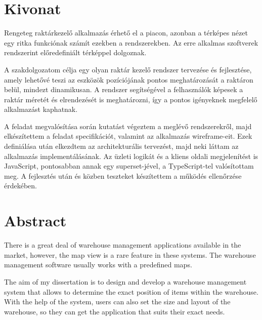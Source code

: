 \setcounter{page}{1}

\selecthungarian

\chapter*{Kivonat}

Rengeteg raktárkezelő alkalmazás érhető el a piacon, azonban a térképes nézet egy ritka funkciónak számít ezekben a rendszerekben. Az erre alkalmas szoftverek rendszerint előredefiniált térképpel dolgoznak.

A szakdolgozatom célja egy olyan raktár kezelő rendszer tervezése és fejlesztése, amely lehetővé teszi az eszközök pozíciójának pontos meghatározását a raktáron belül, mindezt dinamikusan. A rendszer segítségével a felhasználók képesek a raktár méretét és elrendezését is meghatározni, így a pontos igényeknek megfelelő alkalmazást kaphatnak.

A feladat megvalósítása során kutatást végeztem a meglévő rendszerekről, majd elkészítettem a feladat specifikációt, valamint az alkalmazás wireframe-eit. Ezek definiálása után elkezdtem az architekturális tervezést, majd neki láttam az alkalmazás implementálásának. Az üzleti logikát és a kliens oldali megjelenítést is JavaScript, pontosabban annak egy superset-jével, a TypeScript-tel valósítottam meg. A fejlesztés után és közben teszteket készítettem a működés ellenőrzése érdekében.

\vfill
\selectenglish

\chapter*{Abstract}

There is a great deal of warehouse management applications available in the market, however, the map view is a rare feature in these systems. The warehouse management software usually works with a predefined maps.

The aim of my dissertation is to design and develop a warehouse management system that allows to determine the exact position of items within the warehouse. With the help of the system, users can also set the size and layout of the warehouse, so they can get the application that suits their exact needs.

